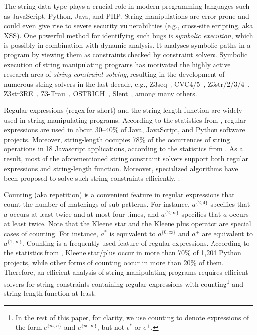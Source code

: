 %

The string data type plays a crucial role in modern programming languages such as JavaScript, Python, Java, and PHP. 
String manipulations are error-prone and could even give rise to severe security vulnerabilities (e.g., cross-site scripting, aka XSS). 
One powerful method for identifying such bugs is \emph{symbolic execution}, which is possibly in combination with dynamic analysis. It analyses symbolic paths in a program by viewing them as constraints checked by constraint solvers. 
%
Symbolic execution of string manipulating programs has motivated the highly active research area of \emph{string constraint solving}, resulting in the development of numerous string solvers in the last decade, e.g.,
Z3seq~\cite{Z3-seq}, CVC4/5~\cite{cvc4}, Z3str/2/3/4~\cite{Z3-str,Z3-str2,Z3-str3,BerzishMurphy2021}, Z3str3RE~\cite{BD+23}, 
Z3-Trau~\cite{Z3-trau}\cite{z3trau}, OSTRICH~\cite{CHL+19}, Slent~\cite{WC+18}, among many others. 

Regular expressions (regex for short) and the string-length function are widely used in string-manipulating programs. According to the statistics from \cite{CS16,DCSL18,WS18}, regular expressions are used in about 30–40\% of Java, JavaScript, and Python software projects. 
Moreover, string-length occupies 78\% of the occurrences of string operations in 18 Javascript applications, according to the statistics from \cite{malware_detection_3_kudzu}. 
As a result, most of the aforementioned string constraint solvers support both regular expressions and string-length function. Moreover, specialized algorithms have been proposed to solve such string constraints efficiently. \cite{LTR+15,BD+23}. 

Counting (aka repetition) is a convenient feature in regular expressions that count the number of matchings of sub-patterns. For instance, $a^{\{2, 4\}}$ specifies that $a$ occurs at least twice and at most four times, and $a^{\{2, \infty\}}$ specifies that $a$ occurs at least twice. 
Note that the Kleene star and the Kleene plus operator are special cases of counting. For instance, $a^*$ is equivalent to $a^{\{0,\infty\}}$ and $a^+$ are equivalent to $a^{\{1,\infty\}}$.
Counting is a frequently used feature of regular expressions. According to the statistics from \cite{CS16}, Kleene star/plus occur in more than 70\% of 1,204 Python projects, while other forms of counting occur in more than 20\% of them. Therefore, an efficient analysis of string manipulating programs requires efficient solvers for string constraints containing regular expressions with counting\footnote{In the rest of this paper, for clarity, we use counting to denote expressions of the form $e^{\{m, n\}}$ and  $e^{\{m, \infty\}}$, but not $e^*$ or $e^+$.} and string-length function at least. 

